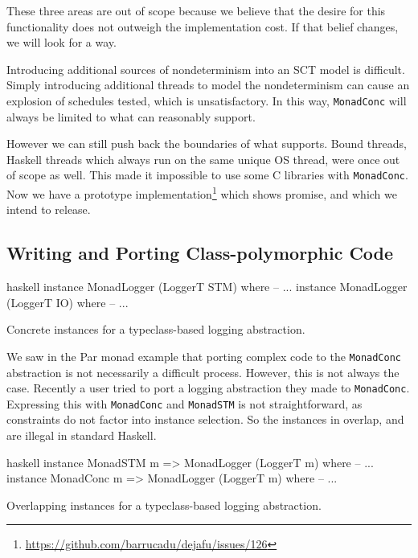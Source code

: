 These three areas are out of scope because we believe that the desire
for this functionality does not outweigh the implementation cost.  If
that belief changes, we will look for a way.

Introducing additional sources of nondeterminism into an SCT model is
difficult.  Simply introducing additional threads to model the
nondeterminism can cause an explosion of schedules tested, which is
unsatisfactory.  In this way, \verb|MonadConc| will always be limited
to what \dejafu{} can reasonably support.

However we can still push back the boundaries of what \dejafu{} supports.
Bound threads, Haskell threads which always run on the same unique OS
thread, were once out of scope as well.  This made it impossible to
use some C libraries with \verb|MonadConc|.  Now we have a prototype
implementation\footnote{\url{https://github.com/barrucadu/dejafu/issues/126}}
which shows promise, and which we intend to release.

\subsection{Writing and Porting Class-polymorphic Code}

\begin{listing}
\centering
\begin{cminted}{haskell}
instance MonadLogger (LoggerT STM) where -- ...
instance MonadLogger (LoggerT IO) where -- ...
\end{cminted}
\caption{Concrete instances for a typeclass-based logging abstraction.}\label{lst:mlogger1}
\end{listing}

We saw in the Par monad example that porting complex code to the
\verb|MonadConc| abstraction is not necessarily a difficult process.
However, this is not always the case.  Recently a user tried to port a
logging abstraction they made to \verb|MonadConc|.  Expressing this
with \verb|MonadConc| and \verb|MonadSTM| is not straightforward, as
constraints do not factor into instance selection.  So the instances
in  overlap, and are illegal in standard Haskell.

\begin{listing}
\centering
\begin{cminted}{haskell}
instance MonadSTM  m => MonadLogger (LoggerT m) where -- ...
instance MonadConc m => MonadLogger (LoggerT m) where -- ...
\end{cminted}
\caption{Overlapping instances for a typeclass-based logging abstraction.}\label{lst:mlogger2}
\end{listing}

